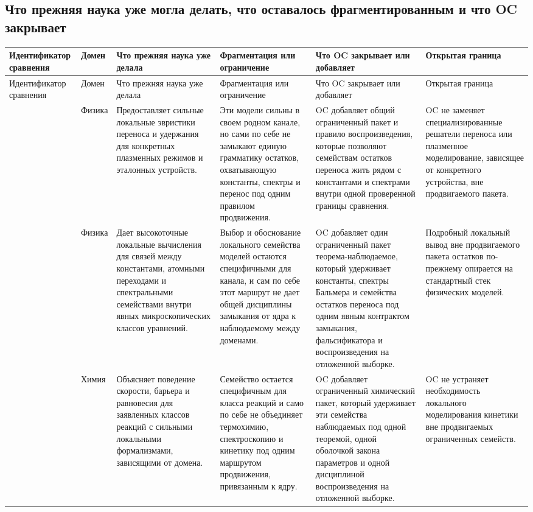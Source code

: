 \subsection{Что прежняя наука уже могла делать, что оставалось фрагментированным и что OC закрывает}
\begingroup
\scriptsize
\setlength{\emergencystretch}{1.5em}
\setlength{\tabcolsep}{2pt}
\setlength{\LTleft}{0pt}
\setlength{\LTright}{0pt}
\begin{longtable}{@{}L{0.17\textwidth}L{0.09\textwidth}L{0.17\textwidth}L{0.17\textwidth}L{0.20\textwidth}L{0.14\textwidth}@{}}
\toprule
Идентификатор сравнения & Домен & Что прежняя наука уже делала & Фрагментация или ограничение & Что OC закрывает или добавляет & Открытая граница \\
\midrule
\endfirsthead
\toprule
Идентификатор сравнения & Домен & Что прежняя наука уже делала & Фрагментация или ограничение & Что OC закрывает или добавляет & Открытая граница \\
\midrule
\endhead
{} & Физика & Предоставляет сильные локальные эвристики переноса и удержания для конкретных плазменных режимов и эталонных устройств. & Эти модели сильны в своем родном канале, но сами по себе не замыкают единую грамматику остатков, охватывающую константы, спектры и перенос под одним правилом продвижения. & OC добавляет общий ограниченный пакет и правило воспроизведения, которые позволяют семействам остатков переноса жить рядом с константами и спектрами внутри одной проверенной границы сравнения. & OC не заменяет специализированные решатели переноса или плазменное моделирование, зависящее от конкретного устройства, вне продвигаемого пакета. \\
 & Физика & Дает высокоточные локальные вычисления для связей между константами, атомными переходами и спектральными семействами внутри явных микроскопических классов уравнений. & Выбор и обоснование локального семейства моделей остаются специфичными для канала, и сам по себе этот маршрут не дает общей дисциплины замыкания от ядра к наблюдаемому между доменами. & OC добавляет один ограниченный пакет теорема-наблюдаемое, который удерживает константы, спектры Бальмера и семейства остатков переноса под одним явным контрактом замыкания, фальсификатора и воспроизведения на отложенной выборке. & Подробный локальный вывод вне продвигаемого пакета остатков по-прежнему опирается на стандартный стек физических моделей. \\
 & Химия & Объясняет поведение скорости, барьера и равновесия для заявленных классов реакций с сильными локальными формализмами, зависящими от домена. & Семейство остается специфичным для класса реакций и само по себе не объединяет термохимию, спектроскопию и кинетику под одним маршрутом продвижения, привязанным к ядру. & OC добавляет ограниченный химический пакет, который удерживает эти семейства наблюдаемых под одной теоремой, одной оболочкой закона параметров и одной дисциплиной воспроизведения на отложенной выборке. & OC не устраняет необходимость локального моделирования кинетики вне продвигаемых ограниченных семейств. \\

\end{longtable}
